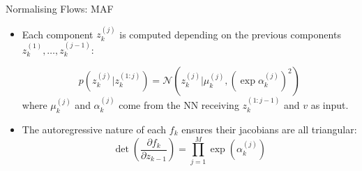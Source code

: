 \documentclass[12pt, aspectratio=169]{beamer}
\let\olditem\item
\renewcommand\item{\olditem\justifying}
\begin{document}
\begin{frame}{Normalising Flows: MAF}
    
    
    \begin{itemize}[<+->]
        \item Each component $z_k^{(j)}$ is computed depending on the previous components $z_k^{(1)}, \ldots, z_k^{(j-1)}$:

        $$p(z_k^{(j)} | z_k^{(1:j)}) = \mathcal{N}(z_k^{(j)} | \mu_k^{(j)}, (\exp\alpha_k^{(j)})^2)$$
        where
        $\mu_k^{(j)}$ and $\alpha_k^{(j)}$ come from the NN receiving $z_k^{(1:j-1)}$ and $v$ as input.

        \item The autoregressive nature of each $f_k$ ensures their jacobians are all triangular: $$\det \left(\frac{\partial f_k}{\partial z_{k-1}}\right) = \prod_{j=1}^M \exp(\alpha_k^{(j)})$$
    \end{itemize}
\end{frame}
\end{document}
